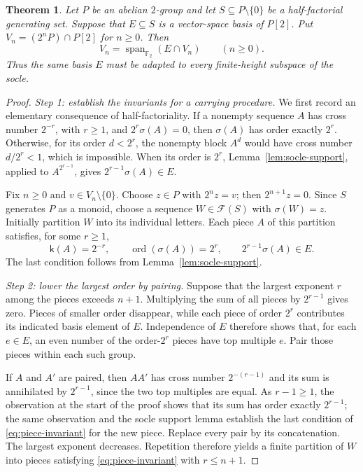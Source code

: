 \documentclass[11pt,reqno]{amsart}
\numberwithin{equation}{section}
\newtheorem{theorem}{Theorem}[section]
\theoremstyle{definition}
\theoremstyle{remark}
\newcommand{\F}{\mathcal F}
\DeclareMathOperator{\ord}{ord}
\begin{document}
\begin{theorem}\label{thm:socle-filtration}
Let $P$ be an abelian $2$-group and let
$S\subseteq P\setminus\{0\}$ be a half-factorial generating
set. Suppose that $E\subseteq S$ is a vector-space basis of
$P[2]$. Put $V_n=(2^nP)\cap P[2]$ for $n\ge0$. Then
\begin{equation}\label{eq:socle-adapted}
 V_n=\operatorname{span}_{\mathbb F_2}(E\cap V_n)
 \qquad(n\ge0).
\end{equation}
Thus the same basis $E$ must be adapted to every finite-height
subspace of the socle.
\end{theorem}

\begin{proof}
\emph{Step 1: establish the invariants for a carrying procedure.}
We first record an elementary consequence of half-factoriality.
If a nonempty sequence $A$ has cross number $2^{-r}$, with
$r\ge1$, and $2^r\sigma(A)=0$, then $\sigma(A)$ has order
exactly $2^r$. Otherwise, for its order $d<2^r$, the nonempty
block $A^d$ would have cross number $d/2^r<1$, which is impossible.
When its order is $2^r$, Lemma~\ref{lem:socle-support}, applied
to $A^{2^{r-1}}$, gives $2^{r-1}\sigma(A)\in E$.

Fix $n\ge0$ and $v\in V_n\setminus\{0\}$. Choose $z\in P$
with $2^nz=v$; then $2^{n+1}z=0$. Since $S$ generates $P$ as
a monoid, choose a sequence $W\in\F(S)$ with $\sigma(W)=z$.
Initially partition $W$ into its individual letters. Each piece
$A$ of this partition satisfies, for some $r\ge1$,
\begin{equation}\label{eq:piece-invariant}
 \mathsf k(A)=2^{-r},\qquad
 \ord(\sigma(A))=2^r,\qquad
 2^{r-1}\sigma(A)\in E.
\end{equation}
The last condition follows from Lemma~\ref{lem:socle-support}.

\emph{Step 2: lower the largest order by pairing.}
Suppose that the largest exponent $r$ among the pieces exceeds
$n+1$. Multiplying the sum of all pieces by $2^{r-1}$ gives zero.
Pieces of smaller order disappear, while each piece of order
$2^r$ contributes its indicated basis element of $E$.
Independence of $E$ therefore shows that, for each $e\in E$,
an even number of the order-$2^r$ pieces have top multiple $e$.
Pair those pieces within each such group.

If $A$ and $A'$ are paired, then $AA'$ has cross number
$2^{-(r-1)}$ and its sum is annihilated by $2^{r-1}$, since the
two top multiples are equal. As $r-1\ge1$, the observation at
the start of the proof shows that its sum has order exactly
$2^{r-1}$; the same observation and the socle support lemma
establish the last condition of \eqref{eq:piece-invariant} for
the new piece. Replace every pair by its concatenation. The
largest exponent decreases. Repetition therefore yields a finite
partition of $W$ into pieces satisfying \eqref{eq:piece-invariant}
with $r\le n+1$.


\end{proof}
\end{document}
